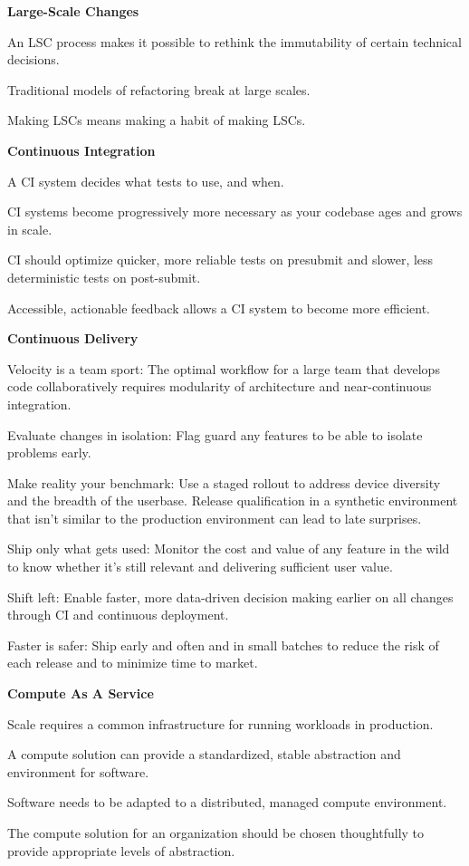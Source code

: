 \item \textbf{Large-Scale Changes}
\bit
\item An LSC process makes it possible to rethink the immutability of certain technical decisions.
\item Traditional models of refactoring break at large scales.
\item Making LSCs means making a habit of making LSCs.
\eit

\item \textbf{Continuous Integration}
\bit
\item A CI system decides what tests to use, and when.
\item CI systems become progressively more necessary as your codebase ages and grows in scale.
\item CI should optimize quicker, more reliable tests on presubmit and slower, less deterministic tests on post-submit.
\item Accessible, actionable feedback allows a CI system to become more efficient.
\eit


\item \textbf{Continuous Delivery}
\bit
\item Velocity is a team sport: The optimal workflow for a large team that develops code collaboratively requires
modularity of architecture and near-continuous integration.
\item Evaluate changes in isolation: Flag guard any features to be able to isolate problems early.
\item Make reality your benchmark: Use a staged rollout to address device diversity and the breadth of the userbase.
Release qualification in a synthetic environment that isn't similar to the production environment can lead to late
surprises.
\item Ship only what gets used: Monitor the cost and value of any feature in the wild to know whether it's still
relevant and delivering sufficient user value.
\item Shift left: Enable faster, more data-driven decision making earlier on all changes through CI and continuous
deployment.
\item Faster is safer: Ship early and often and in small batches to reduce the risk of each release and to minimize
time to market.
\eit

\item \textbf{Compute As A Service}
\bit
\item Scale requires a common infrastructure for running workloads in production.
\item A compute solution can provide a standardized, stable abstraction and environment for software.
\item Software needs to be adapted to a distributed, managed compute environment.
\item The compute solution for an organization should be chosen thoughtfully to provide appropriate levels of
abstraction.
\eit
\een

